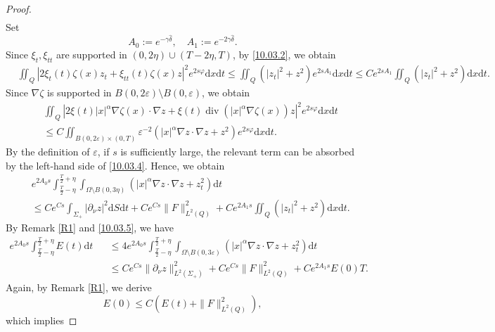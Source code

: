 \documentclass[11pt]{article}
\numberwithin{equation}{section}
\def\pt{\partial}
\def\e{\varepsilon }
\def\vp{\varphi}
\def\pt{\partial}
\def\Om{\Omega}
\def\al{\alpha}
\def\de{\delta}
\def\ga{\gamma}
\def\ts{\times}
\def\f{\frac}
\def\se{\setminus}
\def\df{\mathrm d}
\def\wh{\widehat}
\DeclareMathOperator{\Div}{div}
\begin{document}
\begin{proof}
\begin{equation}
\begin{split}
				\end{split}
			\end{equation}
			Set
			\begin{equation*}
				A_0:=e^{-\ga\wh \de},\quad A_1:=e^{-2\ga \wh \de}.
			\end{equation*}
			Since $\xi_t,\xi_{tt}$ are supported in $(0,2\eta)\cup (T-2\eta, T)$, by \eqref{10.03.2}, we obtain
			\begin{equation*}
				\begin{split}
					&\iint_Q \left|2\xi_t(t)\zeta(x)z_t+\xi_{tt}(t)\zeta(x)z\right|^2e^{2s\vp}\df x\df t\leq \iint_Q \left(|z_t|^2+z^2\right) e^{2sA_1}\df x\df t\leq Ce^{2sA_1}\iint_Q\left(|z_t|^2+z^2\right)\df x\df t.
				\end{split}
			\end{equation*}
			Since $\nabla \zeta$ is supported in $B(0,2\e)\se B(0,\e)$, we obtain
			\begin{eqnarray*}
				&& \iint_Q\left|2\xi(t)|x|^\al \nabla \zeta(x)\cdot \nabla z+\xi(t) \Div(|x|^\al \nabla \zeta(x))z\right|^2e^{2s\vp}\df x\df t\\
				&&\leq  C \iint_{B(0,2\e)\ts (0,T)} \e^{-2}\left(|x|^\al \nabla z\cdot \nabla z+z^2\right) e^{2s\vp}\df x\df t.
			\end{eqnarray*}
			By the definition of  $\e$, if $s$ is sufficiently large, the relevant term can be absorbed by the left-hand side of \eqref{10.03.4}. Hence, we obtain
			\begin{eqnarray*}
				&&e^{2A_0s}\int_{\f{T}{2}-\eta}^{\f{T}{2}+\eta}\int_{\Om\se B(0,3\eta)}\left(|x|^\al \nabla z\cdot \nabla z+z_t^2\right)\df t\\
				&&\leq Ce^{Cs}\int_{\Sigma_+}|\pt_\nu z|^2\df S\df t+Ce^{Cs}\|F\|_{L^2(Q)}^2+Ce^{2A_1s}\iint_Q\left(|z_t|^2+z^2\right)\df x\df t.
			\end{eqnarray*}
			By Remark \ref{R1} and \eqref{10.03.5}, we have
			\begin{eqnarray*}
				e^{2A_0s}\int_{\f{T}{2}-\eta}^{\f{T}{2}+\eta} E(t)\df t
				&&\leq 4e^{2A_0s}\int_{\f{T}{2}-\eta}^{\f{T}{2}+\eta}\int_{\Om\se B(0,3\e)}\left(|x|^\al \nabla z\cdot \nabla z+z_t^2\right)\df t\\
				&&\leq Ce^{Cs}\|\pt_\nu z\|_{L^2(\Sigma_+)}^2+Ce^{Cs}\|F\|_{L^2(Q)}^2+Ce^{2A_1s}E(0)T.
			\end{eqnarray*}
			Again, by Remark \ref{R1}, we derive
			\begin{equation*}
				E(0)\leq C(E(t)+\|F\|_{L^2(Q)}^2),
			\end{equation*}
			which implies

\end{proof}
\end{document}
